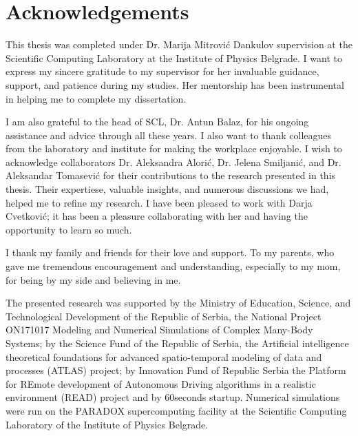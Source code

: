 
\normalsize
\chapter{Acknowledgements}

This thesis was completed under Dr. Marija Mitrović Dankulov supervision at the Scientific Computing Laboratory at the Institute of Physics Belgrade. I want to express my sincere gratitude to my supervisor for her invaluable guidance, support, and patience during my studies. Her mentorship has been instrumental in helping me to complete my dissertation.  

I am also grateful to the head of SCL, Dr. Antun Balaz, for his ongoing assistance and advice through all these years. I also want to thank colleagues from the laboratory and institute for making the workplace enjoyable. I wish to acknowledge collaborators Dr. Aleksandra Alorić, Dr. Jelena Smiljanić, and Dr. Aleksandar Tomasević for their contributions to the research presented in this thesis. Their expertiese, valuable insights, and numerous discussions we had, helped me to refine my research. I have been pleased to work with Darja Cvetković; it has been a pleasure collaborating with her and having the opportunity to learn so much.

I thank my family and friends for their love and support. To my parents, who gave me tremendous encouragement and understanding, especially to my mom, for being by my side and believing in me.

The presented research was supported by the Ministry of Education, Science, and Technological Development of the Republic of Serbia, the National Project ON171017 Modeling and Numerical Simulations of Complex Many-Body Systems; by the Science Fund of the Republic of Serbia, the Artificial intelligence theoretical foundations for advanced spatio-temporal modeling of data and processes (ATLAS) project; by Innovation Fund of Republic Serbia the Platform for REmote development of Autonomous Driving algorithms in a realistic environment (READ) project and by 60seconds startup. Numerical simulations were run on the PARADOX supercomputing facility at the Scientific Computing Laboratory of the Institute of Physics Belgrade.

\hfill

\justify
